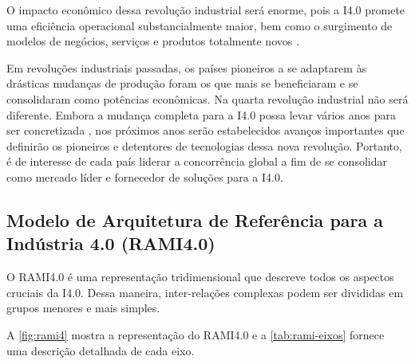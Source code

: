 O impacto econômico dessa revolução industrial será enorme, pois a I4.0 promete uma eficiência operacional substancialmente maior, bem como o surgimento de modelos de negócios, serviços e produtos totalmente novos \cite{hermann2016design}.

Em revoluções industriais passadas, os países pioneiros a se adaptarem às drásticas mudanças de produção foram os que mais se beneficiaram e se consolidaram como potências econômicas. Na quarta revolução industrial não será diferente. Embora a mudança completa para a I4.0 possa levar vários anos para ser concretizada \cite{russmann2015industryfour}, nos próximos anos serão estabelecidos avanços importantes que definirão os pioneiros e detentores de tecnologias dessa nova revolução. Portanto, é de interesse de cada país liderar a concorrência global a fim de se consolidar como mercado líder e fornecedor de soluções para a I4.0.

\subsection{Modelo de Arquitetura de Referência para a Indústria 4.0 (RAMI4.0)}
\label{sub:rami4}

O RAMI4.0 é uma representação tridimensional que descreve todos os aspectos cruciais da I4.0. Dessa maneira, inter-relações complexas podem ser divididas em grupos menores e mais simples.

A \autoref{fig:rami4} mostra a representação do RAMI4.0 e a \autoref{tab:rami-eixos} fornece uma descrição detalhada de cada eixo.

